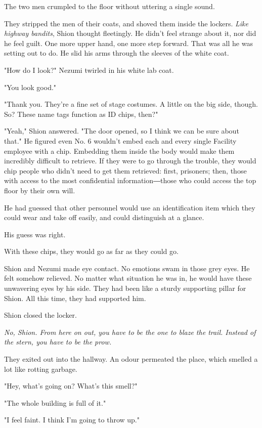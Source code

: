 The two men crumpled to the floor without uttering a single sound.

They stripped the men of their coats, and shoved them inside the
lockers. \emph{Like highway bandits}, Shion thought fleetingly. He didn't feel
strange about it, nor did he feel guilt. One more upper hand, one more
step forward. That was all he was setting out to do. He slid his arms
through the sleeves of the white coat.

"How do I look?" Nezumi twirled in his white lab coat.

"You look good."

"Thank you. They're a fine set of stage costumes. A little on the big
side, though. So? These name tags function as ID chips, then?"

"Yeah," Shion answered. "The door opened, so I think we can be sure
about that." He figured even No. 6 wouldn't embed each and every single
Facility employee with a chip. Embedding them inside the body would make
them incredibly difficult to retrieve. If they were to go through the
trouble, they would chip people who didn't need to get them retrieved:
first, prisoners; then, those with access to the most confidential
information―those who could access the top floor by their own will.

He had guessed that other personnel would use an identification item
which they could wear and take off easily, and could distinguish at a
glance.

His guess was right.

With these chips, they would go as far as they could go.

Shion and Nezumi made eye contact. No emotions swam in those grey eyes.
He felt somehow relieved. No matter what situation he was in, he would
have these unwavering eyes by his side. They had been like a sturdy
supporting pillar for Shion. All this time, they had supported him.

Shion closed the locker.

\emph{No, Shion. From here on out, you have to be the one to blaze the trail.
	Instead of the stern, you have to be the prow.}

They exited out into the hallway. An odour permeated the place, which
smelled a lot like rotting garbage.

"Hey, what's going on? What's this smell?"

"The whole building is full of it."

"I feel faint. I think I'm going to throw up."

